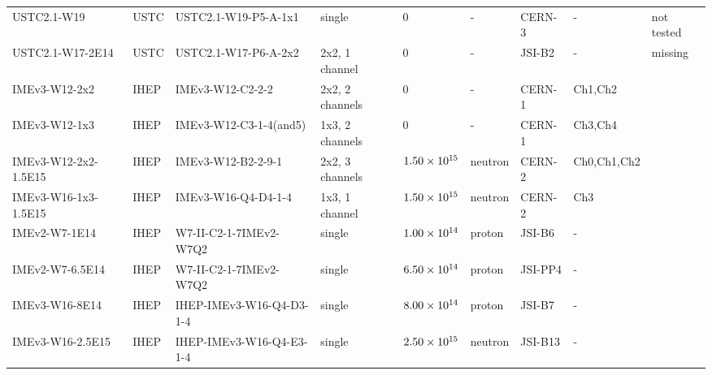 \begin{landscape}
\begin{table}[h]
\begin{tabularx}{\textheight}{|l|l|l|l|l|l|l|l|X|}
            USTC2.1-W19 & USTC & USTC2.1-W19-P5-A-1x1 & single & 0 & - & CERN-3 & - & not tested \\
            USTC2.1-W17-2E14 & USTC & USTC2.1-W17-P6-A-2x2 & 2x2, 1 channel & 0 & - & JSI-B2 & - & missing \\ 
            IMEv3-W12-2x2 & IHEP & IMEv3-W12-C2-2-2 & 2x2, 2 channels & 0 & - & CERN-1 & Ch1,Ch2 &  \\ 
            IMEv3-W12-1x3 & IHEP & IMEv3-W12-C3-1-4(and5) & 1x3, 2 channels & 0 & - & CERN-1 & Ch3,Ch4 &  \\ 
            IMEv3-W12-2x2-1.5E15 & IHEP & IMEv3-W12-B2-2-9-1 & 2x2, 3 channels & $\num{1.50E+15}$ & neutron & CERN-2 & Ch0,Ch1,Ch2 &  \\ 
            IMEv3-W16-1x3-1.5E15 & IHEP & IMEv3-W16-Q4-D4-1-4 & 1x3, 1 channel & $\num{1.50E+15}$ & neutron & CERN-2 & Ch3 &  \\ 
            IMEv2-W7-1E14 & IHEP & W7-II-C2-1-7IMEv2-W7Q2 & single & $\num{1.00E+14}$ & proton & JSI-B6 & - &  \\ 
            IMEv2-W7-6.5E14 & IHEP & W7-II-C2-1-7IMEv2-W7Q2 & single & $\num{6.50E+14}$ & proton & JSI-PP4 & - &  \\ 
            IMEv3-W16-8E14 & IHEP & IHEP-IMEv3-W16-Q4-D3-1-4 & single & $\num{8.00E+14}$ & proton & JSI-B7 & - &  \\ 
            IMEv3-W16-2.5E15 & IHEP & IHEP-IMEv3-W16-Q4-E3-1-4 & single & $\num{2.50E+15}$ & neutron & JSI-B13 & - &  \\ 
            \hline
        \end{tabularx}
\end{table}
\end{landscape}


